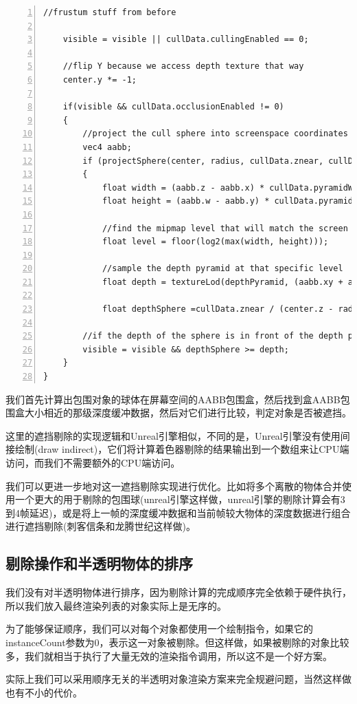 \documentclass{ctexart}
\begin{document}
\begin{lstlisting}[language={[ANSI]C},keywordstyle=\color{blue!70},commentstyle=\color{red!50!green!50!blue!50},frame=shadowbox, rulesepcolor=\color{red!20!green!20!blue!20},basicstyle=\small,numbers=left, numberstyle=\tiny,breaklines=true]
	//frustum stuff from before

	visible = visible || cullData.cullingEnabled == 0;

	//flip Y because we access depth texture that way
	center.y *= -1;

	if(visible && cullData.occlusionEnabled != 0)
	{
		//project the cull sphere into screenspace coordinates
		vec4 aabb;
		if (projectSphere(center, radius, cullData.znear, cullData.P00, cullData.P11, aabb))
		{
			float width = (aabb.z - aabb.x) * cullData.pyramidWidth;
			float height = (aabb.w - aabb.y) * cullData.pyramidHeight;

			//find the mipmap level that will match the screen size of the sphere
			float level = floor(log2(max(width, height)));

			//sample the depth pyramid at that specific level
			float depth = textureLod(depthPyramid, (aabb.xy + aabb.zw) * 0.5, level).x;

			float depthSphere =cullData.znear / (center.z - radius);

		//if the depth of the sphere is in front of the depth pyramid value, then the object is visible
		visible = visible && depthSphere >= depth;
	}
}
\end{lstlisting}

我们首先计算出包围对象的球体在屏幕空间的AABB包围盒，然后找到盒AABB包围盒大小相近的那级深度缓冲数据，然后对它们进行比较，判定对象是否被遮挡。

这里的遮挡剔除的实现逻辑和Unreal引擎相似，不同的是，Unreal引擎没有使用间接绘制(draw indirect)，它们将计算着色器剔除的结果输出到一个数组来让CPU端访问，而我们不需要额外的CPU端访问。

我们可以更进一步地对这一遮挡剔除实现进行优化。比如将多个离散的物体合并使用一个更大的用于剔除的包围球(unreal引擎这样做，unreal引擎的剔除计算会有3到4帧延迟)，或是将上一帧的深度缓冲数据和当前帧较大物体的深度数据进行组合进行遮挡剔除(刺客信条和龙腾世纪这样做)。

\subsection{剔除操作和半透明物体的排序}

我们没有对半透明物体进行排序，因为剔除计算的完成顺序完全依赖于硬件执行，所以我们放入最终渲染列表的对象实际上是无序的。

为了能够保证顺序，我们可以对每个对象都使用一个绘制指令，如果它的instanceCount参数为0，表示这一对象被剔除。但这样做，如果被剔除的对象比较多，我们就相当于执行了大量无效的渲染指令调用，所以这不是一个好方案。

实际上我们可以采用顺序无关的半透明对象渲染方案来完全规避问题，当然这样做也有不小的代价。
\end{document}
